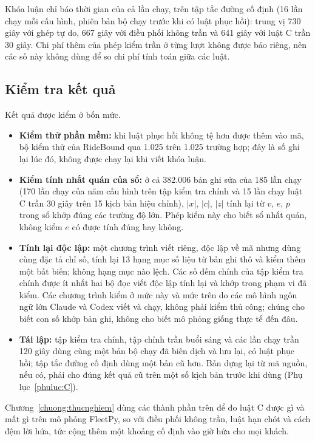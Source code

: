 Khóa luận chỉ báo thời gian của cả lần chạy, trên tập tắc đường cố định (16 lần chạy mỗi cấu hình, phiên bản bộ
chạy trước khi có luật phục hồi): trung vị 730 giây với ghép tự do, 667 giây với điều phối không trần và 641 giây
với luật C trần 30 giây. Chi phí thêm của phép kiểm trần ở từng lượt không được báo riêng, nên các số này không
dùng để so chi phí tính toán giữa các luật.

\subsection{Kiểm tra kết quả}
\label{muc:kiemtra}

Kết quả được kiểm ở bốn mức.
\begin{itemize}[leftmargin=1.2cm,itemsep=2pt,topsep=3pt]
\item \textbf{Kiểm thử phần mềm:} khi luật phục hồi không tệ hơn được thêm vào mã, bộ kiểm thử của RideBound
qua 1.025 trên 1.025 trường hợp; đây là số ghi lại lúc đó, không được chạy lại khi viết khóa luận.
\item \textbf{Kiểm tính nhất quán của sổ:} ở cả 382.006 bản ghi sửa của 185 lần chạy (170 lần chạy của năm cấu
hình trên tập kiểm tra chính và 15 lần chạy luật C trần 30 giây trên 15 kịch bản hiệu chỉnh), $|x|$, $|c|$,
$|z|$ tính lại từ $v$, $e$, $p$ trong sổ khớp đúng các trường độ lớn. Phép kiểm này cho biết sổ nhất quán, không
kiểm $e$ có được tính đúng hay không.
\item \textbf{Tính lại độc lập:} một chương trình viết riêng, độc lập về mã nhưng dùng cùng đặc tả chỉ số, tính
lại 13 hạng mục số liệu từ bản ghi thô và kiểm thêm một bất biến; không hạng mục nào lệch. Các số đếm chính của
tập kiểm tra chính được ít nhất hai bộ đọc viết độc lập tính lại và khớp trong phạm vi đã kiểm. Các chương trình
kiểm ở mức này và mức trên do các mô hình ngôn ngữ lớn Claude và Codex viết và chạy, không phải kiểm thủ công;
chúng cho biết con số khớp bản ghi, không cho biết mô phỏng giống thực tế đến đâu.
\item \textbf{Tái lập:} tập kiểm tra chính, tập chỉnh trần buổi sáng và các lần chạy trần 120 giây dùng cùng một
bản bộ chạy đã biên dịch và lưu lại, có luật phục hồi; tập tắc đường cố định dùng một bản cũ hơn. Bản dựng lại từ
mã nguồn, nếu có, phải cho đúng kết quả cũ trên một số kịch bản trước khi dùng (Phụ lục~\ref{phuluc:C}).
\end{itemize}

Chương~\ref{chuong:thucnghiem} dùng các thành phần trên để đo luật C được gì và mất gì trên mô phỏng FleetPy, so
với điều phối không trần, luật hạn chót và cách đệm lời hứa, tức cộng thêm một khoảng cố định vào giờ hứa cho mọi
khách.
